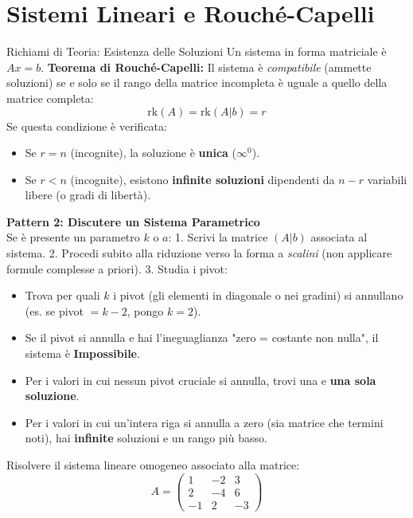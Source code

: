 \section{Sistemi Lineari e Rouché-Capelli}

\begin{concept}{Richiami di Teoria: Esistenza delle Soluzioni}
Un sistema in forma matriciale è $Ax = b$.
\textbf{Teorema di Rouché-Capelli:} Il sistema è \textit{compatibile} (ammette soluzioni) se e solo se il rango della matrice incompleta è uguale a quello della matrice completa:
$$ \text{rk}(A) = \text{rk}(A|b) = r $$
Se questa condizione è verificata:
\begin{itemize}
    \item Se $r = n$ (incognite), la soluzione è \textbf{unica} ($\infty^0$).
    \item Se $r < n$ (incognite), esistono \textbf{infinite soluzioni} dipendenti da $n - r$ variabili libere (o gradi di libertà).
\end{itemize}
\end{concept}

\begin{logicbox}
\textbf{Pattern 2: Discutere un Sistema Parametrico}\\
Se è presente un parametro $k$ o $a$:
1. Scrivi la matrice $(A|b)$ associata al sistema.
2. Procedi subito alla riduzione verso la forma a \textit{scalini} (non applicare formule complesse a priori).
3. Studia i pivot: 
   \begin{itemize}
       \item Trova per quali $k$ i pivot (gli elementi in diagonale o nei gradini) si annullano (es. se pivot $= k-2$, pongo $k=2$).
       \item Se il pivot si annulla e hai l'ineguaglianza "zero = costante non nulla", il sistema è \textbf{Impossibile}.
       \item Per i valori in cui nessun pivot cruciale si annulla, trovi una e \textbf{una sola soluzione}.
       \item Per i valori in cui un'intera riga si annulla a zero (sia matrice che termini noti), hai \textbf{infinite} soluzioni e un rango più basso.
   \end{itemize}
\end{logicbox}

\begin{exercisebox}[title={Esercizio 1: Risoluzione Standard}]
Risolvere il sistema lineare omogeneo associato alla matrice:
$$ A = \begin{pmatrix} 1 & -2 & 3 \\ 2 & -4 & 6 \\ -1 & 2 & -3 \end{pmatrix} $$
\end{exercisebox}

